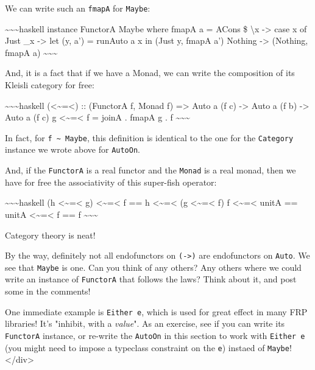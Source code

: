 \documentclass[]{article}
\begin{document}
We can write such an \texttt{fmapA} for \texttt{Maybe}:

\textasciitilde{}\textasciitilde{}\textasciitilde{}haskell instance FunctorA
Maybe where fmapA a = ACons \$ \textbackslash{}x -\textgreater{} case x of Just
\_x -\textgreater{} let (y, a') = runAuto a x in (Just y, fmapA a') Nothing
-\textgreater{} (Nothing, fmapA a)
\textasciitilde{}\textasciitilde{}\textasciitilde{}

And, it is a fact that if we have a Monad, we can write the composition of its
Kleisli category for free:

\textasciitilde{}\textasciitilde{}\textasciitilde{}haskell
(\textless{}\textasciitilde{}=\textless{}) :: (FunctorA f, Monad f)
=\textgreater{} Auto a (f c) -\textgreater{} Auto a (f b) -\textgreater{} Auto a
(f c) g \textless{}\textasciitilde{}=\textless{} f = joinA . fmapA g . f
\textasciitilde{}\textasciitilde{}\textasciitilde{}

In fact, for \texttt{f\ \textasciitilde{}\ Maybe}, this definition is identical
to the one for the \texttt{Category} instance we wrote above for
\texttt{AutoOn}.

And, if the \texttt{FunctorA} is a real functor and the \texttt{Monad} is a real
monad, then we have for free the associativity of this super-fish operator:

\textasciitilde{}\textasciitilde{}\textasciitilde{}haskell (h
\textless{}\textasciitilde{}=\textless{} g)
\textless{}\textasciitilde{}=\textless{} f == h
\textless{}\textasciitilde{}=\textless{} (g
\textless{}\textasciitilde{}=\textless{} f) f
\textless{}\textasciitilde{}=\textless{} unitA == unitA
\textless{}\textasciitilde{}=\textless{} f == f
\textasciitilde{}\textasciitilde{}\textasciitilde{}

Category theory is neat!

By the way, definitely not all endofunctors on \texttt{(-\textgreater{})} are
endofunctors on \texttt{Auto}. We see that \texttt{Maybe} is one. Can you think
of any others? Any others where we could write an instance of \texttt{FunctorA}
that follows the laws? Think about it, and post some in the comments!

One immediate example is \texttt{Either\ e}, which is used for great effect in
many FRP libraries! It's "inhibit, with a \emph{value}". As an exercise, see if
you can write its \texttt{FunctorA} instance, or re-write the \texttt{AutoOn} in
this section to work with \texttt{Either\ e} (you might need to impose a
typeclass constraint on the \texttt{e}) instaed of \texttt{Maybe}!
\textless{}/div\textgreater{}
\end{document}
